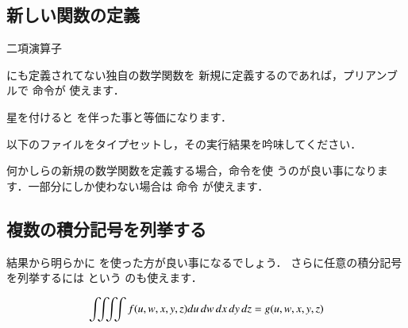 \begin{inout}
\subsection{新しい関数の定義}

\newcommand*\End{\mathop{\mathrm{End}}}
二項演算子

にも定義されてない独自の数学関数を
新規に定義するのであれば，プリアンブルで 命令が
使えます．
\begin{usage}
\DeclareMathOperator{$\<関数名>$}{$\<定義内容>$}%
\DeclareMathOperator*{$\<関数名>$}{$\<定義内容>$}%
\end{usage}
星を付けると を伴った事と等価になります．

以下のファイルをタイプセットし，その実行結果を吟味してください．


何かしらの新規の数学関数を定義する場合，命令を使
うのが良い事になります．一部分にしか使わない場合は 命令
が使えます．


\subsection{複数の積分記号を列挙する}
%
\begin{usage}
\end{usage}

結果から明らかに を使った方が良い事になるでしょう．
さらに任意の積分記号を列挙するには という
のも使えます．
\begin{inout}
\[ f(u,w,x,y,z) du\,dw\,dx\,dy\,dz = g(u,w,x,y,z) \] 
\end{inout}


\end{inout}
